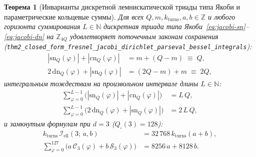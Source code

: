 \documentclass[11pt,a4paper]{article}
\theoremstyle{plain}
\newtheorem{theorem}{Теорема}[section]
\theoremstyle{definition}
\begin{document}
\begin{theorem}[Инварианты дискретной лемнискатической триады типа Якоби и параметрические кольцевые суммы]
\label{thm:main-2}
Для всех $Q, m, k_{\mathrm{turns}}, a, b \in \mathbb{Z}$ и любого горизонта суммирования $L \in \mathbb{N}$ дискретная триада типа Якоби~\eqref{eq:jacobi-sn}--\eqref{eq:jacobi-dn} на $\mathbb{Z}_{4Q}$ удовлетворяет поточечным законам сохранения (\texttt{thm2\_closed\_form\_fresnel\_jacobi\_dirichlet\_parseval\_bessel\_integrals}):
\begin{align}
  |\mathrm{sn}_Q(\varphi)| + |\mathrm{cn}_Q(\varphi)| &= m + (Q - m) \;\equiv\; Q, \label{eq:jacobi-inv-1} \\
  2\,\mathrm{dn}_Q(\varphi) + |\mathrm{sn}_Q(\varphi)| &= (2Q - m) + m \;\equiv\; 2Q, \label{eq:jacobi-inv-2}
\end{align}
интегральным тождествам на произвольном интервале длины $L \in \mathbb{N}$:
\begin{align}
  \sum_{\varphi=0}^{L-1}\bigl(|\mathrm{sn}_Q(\varphi)| + |\mathrm{cn}_Q(\varphi)|\bigr) &= L\,Q, \label{eq:jacobi-int-1} \\
  \sum_{\varphi=0}^{L-1}\bigl(2\,\mathrm{dn}_Q(\varphi) + |\mathrm{sn}_Q(\varphi)|\bigr) &= 2\,L\,Q, \label{eq:jacobi-int-2}
\end{align}
и замкнутым формулам при $d = 3$ ($Q_\square(3) = 128$):
\begin{align}
  k_{\mathrm{turns}}\,\mathcal{I}_{\mathrm{ell}}(3;\, a, b) &= 32\,768\,k_{\mathrm{turns}}(a + b), \label{eq:parametric-elliptic-full} \\
  \sum_{\varphi=0}^{127}\bigl(a\,\mathcal{C}_3(\varphi) + b\,\mathcal{S}_3(\varphi)\bigr) &= 8256\,a + 8128\,b. \label{eq:parametric-elliptic-quad}
\end{align}
\end{theorem}
\end{document}
